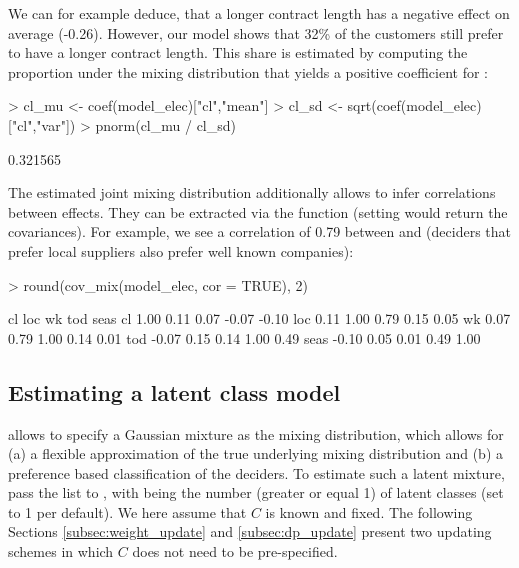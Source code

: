 \documentclass[article,shortnames]{jss}
\newcommand{\fct}[1]{\code{#1()}}
\begin{document}
We can for example deduce, that a longer contract length has a negative effect on average (-0.26). However, our model shows that 32\% of the customers still prefer to have a longer contract length. This share is estimated by computing the proportion under the mixing distribution that yields a positive coefficient for :

\begin{Schunk}
\begin{Sinput}
> cl_mu <- coef(model_elec)["cl","mean"]
> cl_sd <- sqrt(coef(model_elec)["cl","var"])
> pnorm(cl_mu / cl_sd)
\end{Sinput}
\begin{Soutput}
[1] 0.321565
\end{Soutput}
\end{Schunk}

The estimated joint mixing distribution additionally allows to infer correlations between effects. They can be extracted via the \fct{cov\_mix} function (setting  would return the covariances). For example, we see a correlation of 0.79 between  and  (deciders that prefer local suppliers also prefer well known companies):

\begin{Schunk}
\begin{Sinput}
> round(cov_mix(model_elec, cor = TRUE), 2)
\end{Sinput}
\begin{Soutput}
        cl  loc   wk   tod  seas
cl    1.00 0.11 0.07 -0.07 -0.10
loc   0.11 1.00 0.79  0.15  0.05
wk    0.07 0.79 1.00  0.14  0.01
tod  -0.07 0.15 0.14  1.00  0.49
seas -0.10 0.05 0.01  0.49  1.00
\end{Soutput}
\end{Schunk}

\subsection{Estimating a latent class model} \label{subsec:latent_classes}

 allows to specify a Gaussian mixture as the mixing distribution, which allows for (a) a flexible approximation of the true underlying mixing distribution and (b) a preference based classification of the deciders. To estimate such a latent mixture, pass the list  to \fct{fit\_model}, with  being the number (greater or equal 1) of latent classes (set to 1 per default). We here assume that $C$ is known and fixed. The following Sections \ref{subsec:weight_update} and \ref{subsec:dp_update} present two updating schemes in which $C$ does not need to be pre-specified.
\end{document}
